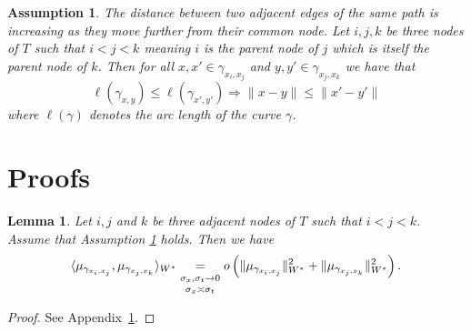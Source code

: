 \documentclass[10pt,a4paper]{amsart}
\newtheorem{assumption}{Assumption}
\newtheorem{lemma}{Lemma}
\begin{document}
\begin{assumption}
\label{A1} 
The distance between two adjacent edges of the same path is increasing as they move further from their common node. Let $i, j, k$ be three nodes of $T$ such that $i < j < k$ meaning $i$ is the parent node of $j$ which is itself the parent node of $k$. Then for all $x, x' \in \gamma_{x_i, x_j}$ and $y, y'\in \gamma_{x_j, x_k}$ we have that
\begin{equation*}
    \ell(\gamma_{x, y}) \leq \ell(\gamma_{x', y'}) \Rightarrow \|x - y\| \leq \|x' - y'\|
\end{equation*}   
where $\ell(\gamma)$ denotes the arc length of the curve $\gamma$. \\
\begin{figure}[!h]  
    \centering
    \vspace{-.3cm}
     
    \vspace{-1.4cm}
    \label{fig:hyp1}
\end{figure}
\end{assumption}

\section{Proofs}\label{app:proofs}

\begin{lemma}\label{lemma:1}
    Let $i, j$ and $k$ be three adjacent nodes of $T$ such that $i < j < k$. Assume that Assumption \ref{A1} holds. Then we have
\begin{equation}
    \label{eq:L1}
    \langle \mu_{\gamma_{x_i, x_j}}, \mu_{\gamma_{x_j, x_k}}\rangle_{W^\ast} \underset{\substack{\vspace{.05cm} \\ \sigma_x, \sigma_t \to 0 \vspace{.1cm} \\ \sigma_x \asymp \sigma_t}}{=} o\left(\|\mu_{\gamma_{x_i, x_j}}\|_{W^\ast}^2 + \|\mu_{\gamma_{x_j, x_k}}\|_{W^\ast}^2\right).
\end{equation}
\end{lemma}

\begin{proof}
    See Appendix~\ref{app:proofs}.
\end{proof}
\end{document}
